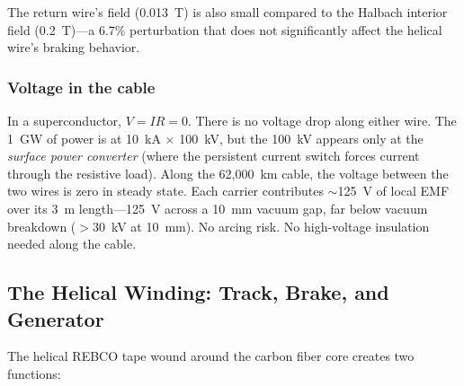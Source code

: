 \documentclass[12pt,letterpaper]{article}
\begin{document}
The return wire's field (0.013~T) is also small compared to the Halbach interior field (0.2~T)---a 6.7\% perturbation that does not significantly affect the helical wire's braking behavior.

\subsubsection{Voltage in the cable}

In a superconductor, $V = IR = 0$. There is no voltage drop along either wire. The 1~GW of power is at 10~kA $\times$ 100~kV, but the 100~kV appears only at the \emph{surface power converter} (where the persistent current switch forces current through the resistive load). Along the 62,000~km cable, the voltage between the two wires is zero in steady state. Each carrier contributes $\sim$125~V of local EMF over its 3~m length---125~V across a 10~mm vacuum gap, far below vacuum breakdown ($>$30~kV at 10~mm). No arcing risk. No high-voltage insulation needed along the cable.

\subsection{The Helical Winding: Track, Brake, and Generator}

The helical REBCO tape wound around the carbon fiber core creates two functions:
\end{document}

